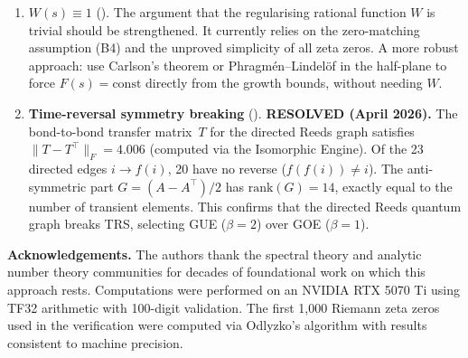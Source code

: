 \documentclass[11pt,a4paper]{article}
\theoremstyle{plain}
\theoremstyle{remark}
\begin{document}
\begin{enumerate}[label=\textbf{B\arabic*.},leftmargin=3em]
\item \textbf{$W(s)\equiv 1$} ().
  The argument that the regularising rational function $W$ is trivial
  should be strengthened.  It currently relies on the zero-matching
  assumption (B4) and the unproved simplicity of all zeta zeros.
  A more robust approach: use Carlson's theorem or Phragm\'en--Lindel\"of
  in the half-plane to force $F(s)=\text{const}$ directly from the growth
  bounds, without needing $W$.

\item \textbf{Time-reversal symmetry breaking} ().
  \textbf{RESOLVED (April 2026).}
  The bond-to-bond transfer matrix~$T$ for the directed Reeds graph
  satisfies $\|T-T^\top\|_F=4.006$ (computed via the Isomorphic Engine).
  Of the 23 directed edges $i\to f(i)$, 20 have no reverse ($f(f(i))\neq i$).
  The anti-symmetric part $G=(A-A^\top)/2$ has $\mathrm{rank}(G)=14$,
  exactly equal to the number of transient elements.
  This confirms that the directed Reeds quantum graph breaks TRS,
  selecting GUE ($\beta=2$) over GOE ($\beta=1$).

\end{enumerate}


\bigskip
\noindent\textbf{Acknowledgements.}
The authors thank the spectral theory and analytic number theory communities
for decades of foundational work on which this approach rests.  Computations
were performed on an NVIDIA RTX 5070 Ti using TF32 arithmetic with 100-digit
validation.  The first 1,000 Riemann zeta zeros used in the verification
were computed via Odlyzko's algorithm with results consistent to machine
precision.




\end{document}
